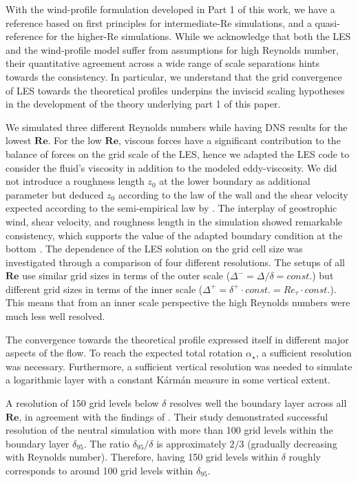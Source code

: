 \documentclass[a4paper,11pt]{article}
\newcommand{\RE}{\mathbf{Re}}
\begin{document}
With the wind-profile formulation developed in Part 1 of this work, we have a reference based on first principles for intermediate-Re simulations, and a quasi-reference for the higher-Re simulations. While we acknowledge that both the LES and the wind-profile model suffer from assumptions for high Reynolds number, their quantitative agreement across a wide range of scale separations hints towards the consistency. In particular, we understand that the grid convergence of LES towards the theoretical profiles underpins the inviscid scaling hypotheses in the development of the theory underlying part 1 of this paper.

We simulated three different Reynolds numbers while having DNS results for the lowest $\RE$. For the low $\RE$, viscous forces have a significant contribution to the balance of forces on the grid scale of the LES, hence we adapted the LES code to consider the fluid's viscosity in addition to the modeled eddy-viscosity. We did not introduce a roughness length $z_0$ at the lower boundary as additional parameter but deduced $z_0$ according to the law of the wall and the shear velocity expected according to the semi-empirical law by \cite{spalart1989theoretical}. The interplay of geostrophic wind, shear velocity, and roughness length in the simulation showed remarkable consistency, which supports the value of the adapted boundary condition at the bottom \citep{maronga2017formulation}. The dependence of the LES solution on the grid cell size was investigated through a comparison of four different resolutions. The setups of all $\RE$ use similar grid sizes in terms of the outer scale ($\Delta^-=\Delta/\delta=const.$) but different grid sizes in terms of the inner scale ($\Delta^+=\delta^+\cdot const. = Re_\tau\cdot const.$). This means that from an inner scale perspective the high Reynolds numbers were much less well resolved.

The convergence towards the theoretical profile expressed itself in different major aspects of the flow. To reach the expected total rotation $\alpha_\star$, a sufficient resolution was necessary. Furthermore, a sufficient vertical resolution was needed to simulate a logarithmic layer with a constant K\'arm\'an measure in some vertical extent.

A resolution of 150 grid levels below $\delta$ resolves well the boundary layer across all $\RE$, in agreement with the findings of \cite{wurps2020grid}. Their study demonstrated successful resolution of the neutral simulation with more than 100 grid levels within the boundary layer $\delta_{95}$. The ratio $\delta_{95}/\delta$ is approximately $2/3$ (gradually decreasing with Reynolds number). Therefore, having 150 grid levels within $\delta$ roughly corresponds to around 100 grid levels within $\delta_{95}$.
\end{document}
